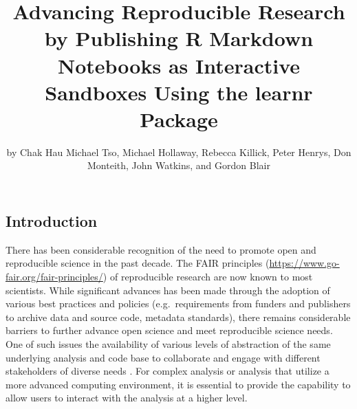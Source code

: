 \title{Advancing Reproducible Research by Publishing R Markdown
Notebooks as Interactive Sandboxes Using the learnr Package}
\author{by Chak Hau Michael Tso, Michael Hollaway, Rebecca
Killick, Peter Henrys, Don Monteith, John Watkins, and Gordon Blair}

\maketitle


\hypertarget{introduction}{%
\subsection{Introduction}\label{introduction}}

There has been considerable recognition of the need to promote open and
reproducible science in the past decade. The FAIR principles
\citep{Wilkinson2016a, Stall2019}
(\url{https://www.go-fair.org/fair-principles/}) of reproducible
research are now known to most scientists. While significant advances
has been made through the adoption of various best practices and
policies (e.g.~requirements from funders and publishers to archive data
and source code, metadata standards), there remains considerable
barriers to further advance open science and meet reproducible science
needs. One of such issues the availability of various levels of
abstraction of the same underlying analysis and code base to collaborate
and engage with different stakeholders of diverse needs
\citep{Blair2019, Hollaway2020}. For complex analysis or analysis that
utilize a more advanced computing environment, it is essential to
provide the capability to allow users to interact with the analysis at a
higher level.

